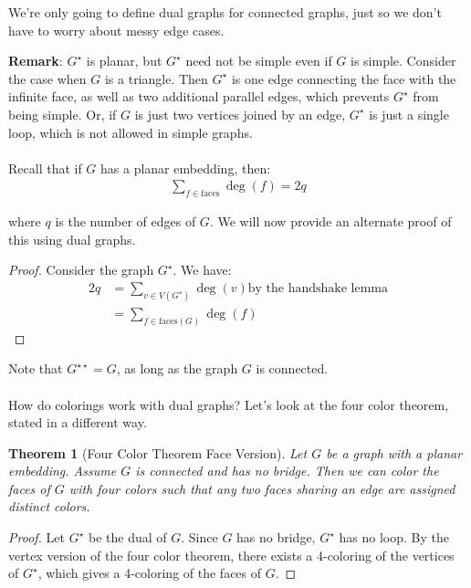\documentclass[]{article}
\newtheorem*{theorem}{Theorem}
\theoremstyle{definition}
\begin{document}
			We're only going to define dual graphs for connected graphs, just so we don't have to worry about messy edge cases.

			\textbf{Remark}: $G^\star$ is planar, but $G^\star$ need not be simple even if $G$ is simple. Consider the case when $G$ is a triangle. Then $G^\star$ is one edge connecting the face with the infinite face, as well as two additional parallel edges, which prevents $G^\star$ from being simple. Or, if $G$ is just two vertices joined by an edge, $G^\star$ is just a single loop, which is not allowed in simple graphs.
			\\ \\
			Recall that if $G$ has a planar embedding, then:
			\begin{align*}
				\sum_{f \in \text{faces}} \deg(f) = 2q
			\end{align*}

			where $q$ is the number of edges of $G$. We will now provide an alternate proof of this using dual graphs.

			\begin{proof}
				Consider the graph $G^\star$. We have:
				\begin{align*}
					2q &= \sum_{v \in V(G^\star)} \deg(v) \text{by the handshake lemma} \\
					&= \sum_{f \in \text{faces}(G)} \deg(f)
				\end{align*}
			\end{proof}

			Note that $G^{\star \star} = G$, as long as the graph $G$ is connected.
			\\ \\
			How do colorings work with dual graphs? Let's look at the four color theorem, stated in a different way.
			\begin{theorem}[Four Color Theorem \textendash{} Face Version]
				Let $G$ be a graph with a planar embedding. Assume $G$ is connected and has no bridge. Then we can color the faces of $G$ with four colors such that any two faces sharing an edge are assigned distinct colors.
			\end{theorem}

			\begin{proof}
				Let $G^\star$ be the dual of $G$. Since $G$ has no bridge, $G^\star$ has no loop. By the vertex version of the four color theorem, there exists a 4-coloring of the vertices of $G^\star$, which gives a 4-coloring of the faces of $G$.
			\end{proof}
\end{document}
